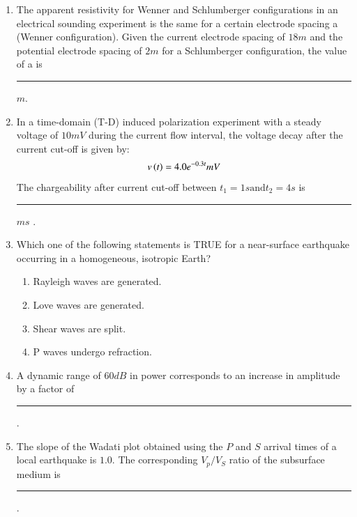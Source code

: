 \documentclass[journal,12pt,onecolumn]{IEEEtran}
\theoremstyle{remark}
\begin{document}
\begin{enumerate}
    \item The apparent resistivity for Wenner and Schlumberger configurations in an electrical sounding experiment is the same for a certain electrode spacing a (Wenner configuration). Given the current electrode spacing of $18 m$ and the potential electrode spacing of $2 m$ for a Schlumberger configuration, the value of a is \rule{3cm}{0.15mm} $m$. \hfill{}
    
    \item In a time-domain (T-D) induced polarization experiment with a steady voltage of $10 mV$ during the current flow interval, the voltage decay after the current cut-off is given by:
    $$v\left(t\right) = 4.0e^{-0.3t}mV$$ 
    The chargeability after current cut-off between $t_1 = 1s \text{and} t_2 = 4s $ is \rule{3cm}{0.15mm} $ms$ . \hfill{}
    
    \item Which one of the following statements is TRUE for a near-surface earthquake occurring in a homogeneous, isotropic Earth? \hfill{}
                \begin{enumerate}
                        \item Rayleigh waves are generated.
                        \item Love waves are generated.
                        \item Shear waves are split. 
                        \item P waves undergo refraction.
                \end{enumerate}
            
    \item A dynamic range of $60 dB$ in power corresponds to an increase in amplitude by a factor of \rule{3cm}{0.15mm}. \hfill{}
    
    \item The slope of the Wadati plot obtained using the $P$ and $S$ arrival times of a local earthquake is $1.0$. The corresponding $V_p/V_S$ ratio of the subsurface medium is \rule{3cm}{0.15mm}. \hfill{}
    

\end{enumerate}
\end{document}
